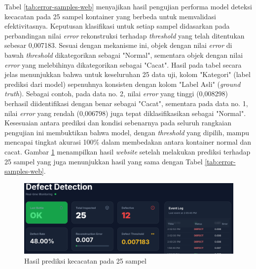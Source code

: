 Tabel \ref{tab:error-samples-web} menyajikan hasil pengujian
performa model deteksi kecacatan pada 25 sampel kontainer yang
berbeda untuk memvalidasi efektivitasnya. Keputusan klasifikasi untuk
setiap sampel didasarkan pada perbandingan nilai \textit{error} rekonstruksi
terhadap \textit{threshold} yang telah ditentukan sebesar
0,007183. Sesuai dengan mekanisme ini, objek dengan nilai \textit{error} di
bawah \textit{threshold} dikategorikan sebagai "Normal", sementara objek
dengan nilai \textit{error} yang melebihinya dikategorikan sebagai "Cacat".
Hasil pada tabel secara jelas menunjukkan bahwa untuk keseluruhan 25
data uji, kolom "Kategori" (label prediksi dari model) sepenuhnya
konsisten dengan kolom "Label Asli" (\textit{ground truth}). Sebagai
contoh, pada data no. 2, nilai \textit{error} yang tinggi (0,008298)
berhasil diidentifikasi dengan benar sebagai "Cacat", sementara pada
data no. 1, nilai \textit{error} yang rendah (0,006798) juga tepat
diklasifikasikan sebagai "Normal". Kesesuaian antara
prediksi dan kondisi sebenarnya pada seluruh rangkaian pengujian ini
membuktikan bahwa model, dengan \textit{threshold} yang dipilih, mampu
mencapai tingkat akurasi 100\% dalam membedakan antara kontainer
normal dan cacat. Gambar \ref{fig:web-25} menampilkan hasil \textit{website}
setelah melakukan prediksi terhadap 25 sampel yang juga menunjukkan
hasil yang sama dengan Tabel \ref{tab:error-samples-web}.

\begin{figure}[H]
  \centering
  \includegraphics[width=\textwidth]{gambar/ss_web_25.png}
  \caption{Hasil prediksi kecacatan pada 25 sampel}
  \label{fig:web-25}
\end{figure}
\vspace{-1em}
